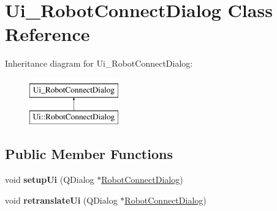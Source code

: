 \hypertarget{classUi__RobotConnectDialog}{}\section{Ui\+\_\+\+Robot\+Connect\+Dialog Class Reference}
\label{classUi__RobotConnectDialog}
Inheritance diagram for Ui\+\_\+\+Robot\+Connect\+Dialog\+:\begin{figure}[H]
\begin{center}
\leavevmode
\includegraphics[height=2.000000cm]{classUi__RobotConnectDialog}
\end{center}
\end{figure}
\subsection*{Public Member Functions}
\begin{DoxyCompactItemize}
\item 
\hypertarget{classUi__RobotConnectDialog_a78d76df0eddc0a7ab4efa825cca8bb2f}{}void {\bfseries setup\+Ui} (Q\+Dialog $\ast$\hyperlink{classRobotConnectDialog}{Robot\+Connect\+Dialog})\label{classUi__RobotConnectDialog_a78d76df0eddc0a7ab4efa825cca8bb2f}

\item 
\hypertarget{classUi__RobotConnectDialog_ae9b4da508c51dcd0992ba2c3624448c0}{}void {\bfseries retranslate\+Ui} (Q\+Dialog $\ast$\hyperlink{classRobotConnectDialog}{Robot\+Connect\+Dialog})\label{classUi__RobotConnectDialog_ae9b4da508c51dcd0992ba2c3624448c0}

\end{DoxyCompactItemize}

